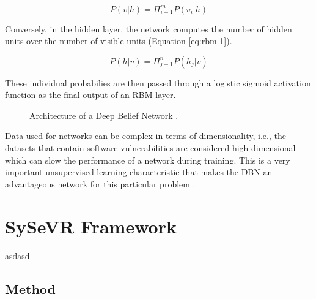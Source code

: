 \documentclass[12pt,twocolumn,letterpaper]{article}
\begin{document}
\begin{equation}
\label{eq:rbm-0}
    P(v|h)=\Pi_{i-1}^{m}P(v_{i}|h)
\end{equation}

Conversely, in the hidden layer, the network computes the number of hidden units over the number of 
visible units (Equation \ref{eq:rbm-1}).

\begin{equation}
\label{eq:rbm-1}
    P(h|v)=\Pi_{j-1}^{n}P(h_{j}|v)
\end{equation}

These individual probabilies are then passed through a logistic sigmoid activation function as the final 
output of an RBM layer.

\begin{figure}[h]
    \centering

    \caption{Architecture of a Deep Belief Network \cite{Lin20}.}
    \label{fig:dl-4}
\end{figure}

Data used for networks can be complex in terms of dimensionality, i.e., the datasets that contain software 
vulnerabilities are considered high-dimensional which can slow the performance of a network during training. 
This is a very important unsupervised learning characteristic that makes the DBN an advantageous network 
for this particular problem \cite{Lin20}.

\section{SySeVR Framework}
\label{sec:sysevr-framework}
asdasd
\cite{Li22}

\subsection{Method}
\label{sub:method}
\end{document}

